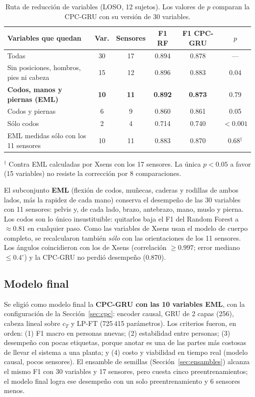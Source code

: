 \documentclass[letterpaper,11pt]{article}
\begin{document}
\begin{table}[H]
  \centering
  \small
  \caption{Ruta de reducción de variables (LOSO, 12 sujetos). Los valores de $p$ comparan la CPC-GRU con su versión de 30 variables.}
  \label{tab:reduccion}
  \begin{tabular}{lccccc}
    \toprule
    Variables que quedan & Var. & Sensores & F1 RF & F1 CPC-GRU & $p$ \\
    \midrule
    Todas                                          & 30 & 17 & 0.894 & 0.878 & --- \\
    Sin posiciones, hombros, pies ni cabeza & 15 & 12 & 0.896 & 0.883 & 0.04 \\
    \textbf{Codos, manos y piernas (EML)}          & \textbf{10} & \textbf{11} & \textbf{0.892} & \textbf{0.873} & 0.79 \\
    Codos y piernas                                & 6  & 9  & 0.860 & 0.861 & 0.05 \\
    Sólo codos                                     & 2  & 4  & 0.714 & 0.740 & $< 0.001$ \\
    \midrule
    EML medidas sólo con los 11 sensores & 10 & 11 & 0.883 & 0.870 & 0.68$^{\dagger}$ \\
    \bottomrule
  \end{tabular}

  \smallskip
  {\footnotesize $^{\dagger}$ Contra EML calculadas por Xsens con los 17 sensores. La única $p < 0.05$ a favor (15 variables) no resiste la corrección por 8 comparaciones.}
\end{table}

El subconjunto \textbf{EML} (flexión de codos, muñecas, caderas y rodillas de ambos lados, más la rapidez de cada mano) conserva el desempeño de las 30 variables con 11 sensores: pelvis y, de cada lado, brazo, antebrazo, mano, muslo y pierna. Los codos son lo único insustituible: quitarlos baja el F1 del Random Forest a $\approx 0.81$ en cualquier paso. Como las variables de Xsens usan el modelo de cuerpo completo, se recalcularon también \emph{sólo} con las orientaciones de los 11 sensores. Los ángulos coincidieron con los de Xsens (correlación $\ge 0.997$; error mediano $\le 0.4^\circ$) y la CPC-GRU no perdió desempeño (0.870).

\subsection{Modelo final}
\label{sec:final}
Se eligió como modelo final la \textbf{CPC-GRU con las 10 variables EML}, con la configuración de la Sección~\ref{sec:cpc}: encoder causal, GRU de 2 capas (256), cabeza lineal sobre $c_T$ y LP-FT (725\,415 parámetros). Los criterios fueron, en orden: (1) F1 macro en personas nuevas; (2) estabilidad entre personas; (3) desempeño con pocas etiquetas, porque anotar es una de las partes más costosas de llevar el sistema a una planta; y (4) costo y viabilidad en tiempo real (modelo causal, pocos sensores). El ensamble de semillas (Sección~\ref{sec:ensambles}) alcanza el mismo F1 con 30 variables y 17 sensores, pero cuesta cinco preentrenamientos; el modelo final logra ese desempeño con un solo preentrenamiento y 6 sensores menos.
\end{document}
